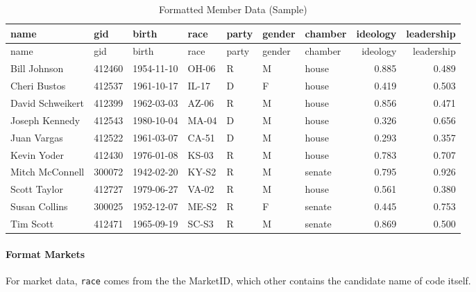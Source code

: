\documentclass[]{article}
\let\oldparagraph\paragraph
\renewcommand{\paragraph}[1]{\oldparagraph{#1}\mbox{}}
\begin{document}
\begin{longtable}[]{@{}lllllllrr@{}}
\caption{Formatted Member Data (Sample)}\tabularnewline
\toprule
name & gid & birth & race & party & gender & chamber & ideology &
leadership\tabularnewline
\midrule
\endfirsthead
\toprule
name & gid & birth & race & party & gender & chamber & ideology &
leadership\tabularnewline
\midrule
\endhead
Bill Johnson & 412460 & 1954-11-10 & OH-06 & R & M & house & 0.885 &
0.489\tabularnewline
Cheri Bustos & 412537 & 1961-10-17 & IL-17 & D & F & house & 0.419 &
0.503\tabularnewline
David Schweikert & 412399 & 1962-03-03 & AZ-06 & R & M & house & 0.856 &
0.471\tabularnewline
Joseph Kennedy & 412543 & 1980-10-04 & MA-04 & D & M & house & 0.326 &
0.656\tabularnewline
Juan Vargas & 412522 & 1961-03-07 & CA-51 & D & M & house & 0.293 &
0.357\tabularnewline
Kevin Yoder & 412430 & 1976-01-08 & KS-03 & R & M & house & 0.783 &
0.707\tabularnewline
Mitch McConnell & 300072 & 1942-02-20 & KY-S2 & R & M & senate & 0.795 &
0.926\tabularnewline
Scott Taylor & 412727 & 1979-06-27 & VA-02 & R & M & house & 0.561 &
0.380\tabularnewline
Susan Collins & 300025 & 1952-12-07 & ME-S2 & R & F & senate & 0.445 &
0.753\tabularnewline
Tim Scott & 412471 & 1965-09-19 & SC-S3 & R & M & senate & 0.869 &
0.500\tabularnewline
\bottomrule
\end{longtable}

\hypertarget{format-markets}{%
\paragraph{Format Markets}\label{format-markets}}

For market data, \texttt{race} comes from the the MarketID, which other
contains the candidate name of code itself.
\end{document}
